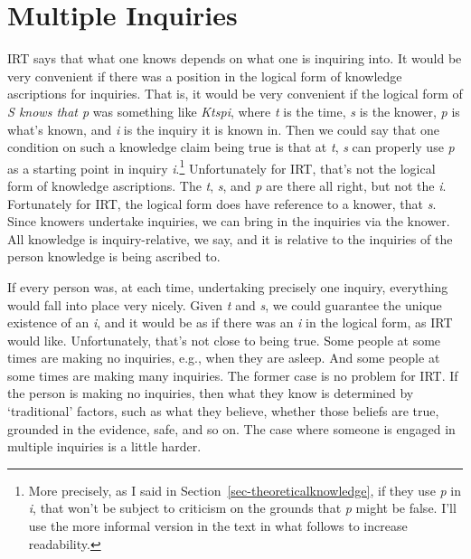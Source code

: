 \documentclass[
  10pt,
  letterpaper,
  twoside]{scrbook}
\begin{document}
\section{Multiple Inquiries}\label{sec-multiple}

IRT says that what one knows depends on what one is inquiring into. It
would be very convenient if there was a position in the logical form of
knowledge ascriptions for inquiries. That is, it would be very
convenient if the logical form of \emph{S knows that p} was something
like \emph{Ktspi}, where \emph{t} is the time, \emph{s} is the knower,
\emph{p} is what's known, and \emph{i} is the inquiry it is known in.
Then we could say that one condition on such a knowledge claim being
true is that at \emph{t}, \emph{s} can properly use \emph{p} as a
starting point in inquiry \emph{i}.\footnote{More precisely, as I said
  in Section~\ref{sec-theoreticalknowledge}, if they use \emph{p} in
  \emph{i}, that won't be subject to criticism on the grounds that
  \emph{p} might be false. I'll use the more informal version in the
  text in what follows to increase readability.} Unfortunately for IRT,
that's not the logical form of knowledge ascriptions. The \emph{t},
\emph{s}, and \emph{p} are there all right, but not the \emph{i}.
Fortunately for IRT, the logical form does have reference to a knower,
that \emph{s}. Since knowers undertake inquiries, we can bring in the
inquiries via the knower. All knowledge is inquiry-relative, we say, and
it is relative to the inquiries of the person knowledge is being
ascribed to.

If every person was, at each time, undertaking precisely one inquiry,
everything would fall into place very nicely. Given \emph{t} and
\emph{s}, we could guarantee the unique existence of an \emph{i}, and it
would be as if there was an \emph{i} in the logical form, as IRT would
like. Unfortunately, that's not close to being true. Some people at some
times are making no inquiries, e.g., when they are asleep. And some
people at some times are making many inquiries. The former case is no
problem for IRT. If the person is making no inquiries, then what they
know is determined by `traditional' factors, such as what they believe,
whether those beliefs are true, grounded in the evidence, safe, and so
on. The case where someone is engaged in multiple inquiries is a little
harder.
\end{document}
